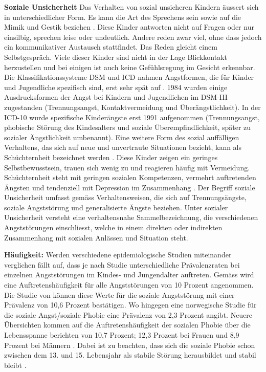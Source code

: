 \textbf{Soziale Unsicherheit}
Das Verhalten von sozial unsicheren Kindern äussert sich in unterschiedlicher Form. Es kann die Art des Sprechens sein sowie auf die Mimik und Gestik beziehen \cite{Petermann:2015}. Diese Kinder antworten nicht auf Fragen oder nur einsilbig, sprechen leise oder undeutlich. Andere reden zwar viel, ohne dass jedoch ein kommunikativer Austausch stattfindet. Das Reden gleicht einem Selbstgespräch. Viele dieser Kinder sind nicht in der Lage Blickkontakt herzustellen und bei einigen ist auch keine Gefühlsregung im Gesicht erkennbar. Die Klassifikationssysteme DSM und ICD nahmen Angstformen, die für Kinder und Jugendliche spezifisch sind, erst sehr spät auf \cite{Petermann:2015}. 1984 wurden einige Ausdrucksformen der Angst bei Kindern und Jugendlichen im DSM-III zugestanden (Trennungsangst, Kontaktvermeidung und Überängstlichkeit). In der ICD-10 wurde spezifische Kinderängste erst 1991 aufgenommen (Trennungsangst, phobische Störung des Kindesalters und soziale Überempfindlichkeit, später zu sozialer Ängstlichkeit umbenannt). Eine weitere Form des sozial auffälligen Verhaltens, das sich auf neue und unvertraute Situationen bezieht, kann als Schüchternheit bezeichnet werden \cite{Petermann:2015b}. Diese Kinder zeigen ein geringes Selbstbewusstsein, trauen sich wenig zu und reagieren häufig mit Vermeidung. Schüchternheit steht mit geringen sozialen Kompetenzen, vermehrt auftretenden Ängsten und tendenziell mit Depression im Zusammenhang \cite{Karevold:2012}. Der Begriff soziale Unsicherheit umfasst gemäss  Verhaltensweisen, die sich auf Trennungsängste, soziale Angststörung und generalisierte Ängste beziehen. Unter sozialer Unsicherheit versteht  eine verhaltensnahe Sammelbezeichnung, die verschiedenen Angststörungen einschliesst, welche in einem direkten oder indirekten Zusammenhang mit sozialen Anlässen und Situation steht. 

\textbf{Häufigkeit:} Werden verschiedene epidemiologische Studien miteinander verglichen fällt auf, dass je nach Studie unterschiedliche Prävalenzraten bei einzelnen Angststörungen im Kindes- und Jungendalter auftreten. Gemäss  wird eine Auftretenshäufigkeit für alle Angststörungen von 10 Prozent angenommen. Die Studie von  können diese Werte für die soziale Angststörung mit einer Prävalenz von 10,6 Prozent bestätigen. Wo hingegen eine norwegische Studie \cite{VanRoy:2009} für die soziale Angst/soziale Phobie eine Prävalenz von 2,3 Prozent angibt. Neuere Übersichten kommen auf die Auftretenshäufigkeit der sozialen Phobie über die Lebensspanne berichten von 10,7 Prozent; 12,3 Prozent bei Frauen und 8,9 Prozent bei Männern \cite{Kessler:2012}. Dabei ist zu beachten, dass sich die soziale Phobie schon zwischen dem 13. und 15. Lebensjahr als stabile Störung herausbildet und stabil bleibt \cite{Petermann:2015}. 

